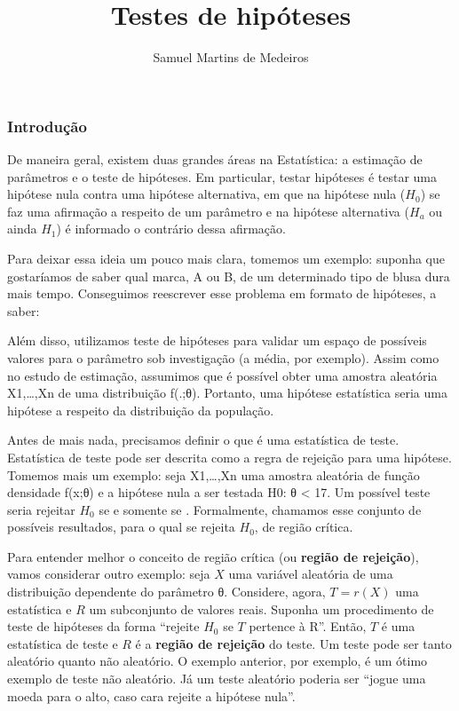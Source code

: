 \documentclass[
]{article}
\title{Testes de hipóteses}
\author{Samuel Martins de Medeiros}
\date{}
\begin{document}
\maketitle

\hypertarget{introduuxe7uxe3o}{%
\subsubsection{Introdução}\label{introduuxe7uxe3o}}

De maneira geral, existem duas grandes áreas na Estatística: a estimação
de parâmetros e o teste de hipóteses. Em particular, testar hipóteses é
testar uma hipótese nula contra uma hipótese alternativa, em que na
hipótese nula (\(H_0\)) se faz uma afirmação a respeito de um parâmetro
e na hipótese alternativa (\(H_a\) ou ainda \(H_1\)) é informado o
contrário dessa afirmação.

Para deixar essa ideia um pouco mais clara, tomemos um exemplo: suponha
que gostaríamos de saber qual marca, A ou B, de um determinado tipo de
blusa dura mais tempo. Conseguimos reescrever esse problema em formato
de hipóteses, a saber:

Além disso, utilizamos teste de hipóteses para validar um espaço de
possíveis valores para o parâmetro sob investigação (a média, por
exemplo). Assim como no estudo de estimação, assumimos que é possível
obter uma amostra aleatória X1,\ldots,Xn de uma distribuição f(.;θ).
Portanto, uma hipótese estatística seria uma hipótese a respeito da
distribuição da população.

Antes de mais nada, precisamos definir o que é uma estatística de teste.
Estatística de teste pode ser descrita como a regra de rejeição para uma
hipótese. Tomemos mais um exemplo: seja X1,\ldots,Xn uma amostra
aleatória de função densidade f(x;θ) e a hipótese nula a ser testada H0:
θ \textless{} 17. Um possível teste seria rejeitar \(H_0\) se e somente
se . Formalmente, chamamos esse conjunto de possíveis resultados, para o
qual se rejeita \(H_0\), de região crítica.

Para entender melhor o conceito de região crítica (ou \textbf{região de
rejeição}), vamos considerar outro exemplo: seja \(X\) uma variável
aleatória de uma distribuição dependente do parâmetro θ. Considere,
agora, \(T = r(X)\) uma estatística e \(R\) um subconjunto de valores
reais. Suponha um procedimento de teste de hipóteses da forma ``rejeite
\(H_0\) se \(T\) pertence à R''. Então, \(T\) é uma estatística de teste
e \(R\) é a \textbf{região de rejeição} do teste. Um teste pode ser
tanto aleatório quanto não aleatório. O exemplo anterior, por exemplo, é
um ótimo exemplo de teste não aleatório. Já um teste aleatório poderia
ser ``jogue uma moeda para o alto, caso cara rejeite a hipótese nula''.
\end{document}
